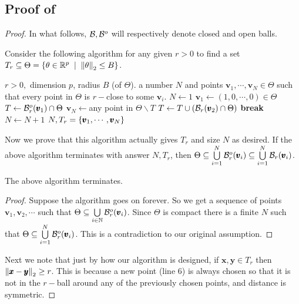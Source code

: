 \subsection{Proof of }\label{pf:rnet}
\begin{proof}In what follows, ${\mathcal{B}},{\mathcal{B}}^{o}$ will respectively denote closed and open balls. 

Consider the following algorithm for any given $r>0$ to find a set $T_{r}\subseteq \Theta = \set{\theta\in\R^{p}\st \norm\theta2\le B}$. 
\begin{algorithmic}[1]
\Require $r>0,$ dimension $p$, radius $B$ (of $\Theta$).
\Ensure a number $N$ and points $\pmb v_{1},\cdots,\pmb v_{N}\in \Theta$ such that every point in $\Theta$ is $r-$close to some $\pmb v_{i}$.
\Begin
\State $N\gets 1$
\State $\pmb v_{1} \gets (1,0,\cdots,0)\in\Theta$
\State $T \gets {\mathcal{B}}_{r}^{o}(\pmb v_{1})\cap \Theta$ 
    \State $\pmb v_{N} \gets $any point in $\Theta\smallsetminus T$
    \State $T \gets T\cup ({\mathcal{B}}_{r}(\pmb v_{2})\cap \Theta)$
     
    	\State \textbf{break}
	\Else
		\State $N \gets N+1$
	\EndIf
\EndWhile 
\State \Return $N,T_{r} = \left\{\pmb v_{1},\cdots,\pmb v_{N}\right\}$
\End
\end{algorithmic}

Now we prove that this algorithm actually gives $T_{r}$ and size $N$ as desired. 
If the above algorithm terminates with answer $N,T_{r}$, then $\Theta\subseteq \bigcup\limits_{i=1}^{N}{\mathcal{B}}_{r}^{o}(\pmb v_{i}) \subseteq \bigcup\limits_{i=1}^{N}{\mathcal{B}}_{r}(\pmb v_{i})$.

\begin{cl}
The above algorithm terminates.
\end{cl}
\begin{proof}
Suppose the algorithm goes on forever. So we get a sequence of points $\pmb v_{1}, \pmb v_{2},\cdots$ such that $\Theta \subseteq \bigcup\limits_{i\in\mathbb{N}}{\mathcal{B}}_{r}^{o}(\pmb v_{i})$. Since $\Theta$ is compact there is a finite $N$ such that $\Theta\subseteq \bigcup\limits_{i=1}^{N}{\mathcal{B}}_{r}^{o}(\pmb v_{i})$. This is a contradiction to our original assumption.
\end{proof}

Next we note that just by how our algorithm is designed, if $\pmb x,\pmb y\in T_{r}$ then $\left\lVert \pmb x-\pmb y \right\rVert_{2}\ge r$. This is because a new point (line $6$) is always chosen so that it is not in the $r-$ball around any of the previously chosen points, and distance is symmetric.


\end{proof}
